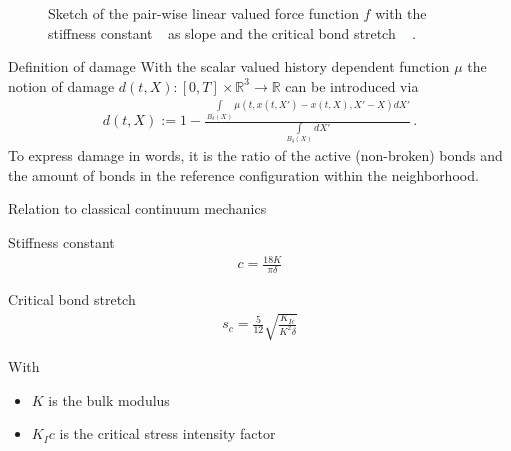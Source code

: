 \documentclass[\classoption]{beamer}
\newcommand{\R}{\mathbb{R}}
\newcommand{\args}{(t,x(t,X')-x(t,X),X'-X)}
\begin{document}
\begin{frame}{}
\begin{figure}[H]
\caption[Sketch of the pair-wise linear valued force function $f$ with the stiffness constant $c$ as slope and the critical bond stretch $s_c$.]{Sketch of the pair-wise linear valued force function $f$ with the stiffness constant \textcolor{azure}{$c$} as slope and the critical bond stretch \textcolor{azure}{$s_c$}.}
\label{fig::force::sketch::critical}
\end{figure}
\end{frame}

\begin{frame}{Definition of damage}
With the scalar valued history dependent function $\mu$ the notion of damage $d(t,X):[0,T]\times\R^3\rightarrow\R$ can be introduced via
\begin{align*}
d(t,X):= 1- \frac{\displaystyle\int\limits_{B_\delta(X)}\mu\args dX'}{\displaystyle\int\limits_{B_\delta(X)}dX'}\,\text{.}
\label{eq::damage:nodal}
\end{align*}
To express damage in words, it is the ratio of the active (non-broken) bonds and the amount of bonds in the reference configuration within the neighborhood.
\end{frame}



\begin{frame}{Relation to classical continuum mechanics}
\begin{block}{Stiffness constant}
\begin{align*}
c = \frac{18K}{\pi\delta}
\end{align*}
\end{block}
\vspace{-0.25cm}
\begin{block}{Critical bond stretch}
\begin{align*}
s_c = \frac{5}{12} \sqrt{\frac{K_{Ic}}{K^2\delta}}
\end{align*}
\end{block}
\vspace{-0.25cm}
With
\begin{itemize}
\item $K$ is the bulk modulus
\item $K_Ic$ is the critical stress intensity factor
\end{itemize}
\end{frame}
\end{document}

